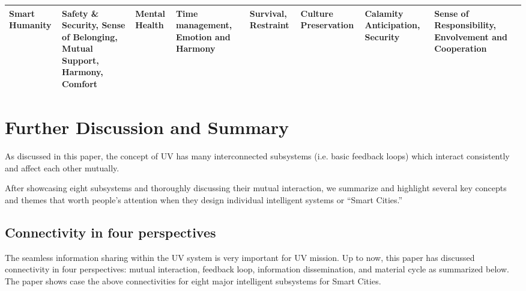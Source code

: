 \documentclass[letterpaper, twocolumn, 10pt, conference]{IEEEtran}
\begin{document}
\begin{landscape}
\begin{table}[p]
\begin{center}
\begin{tabularx}{1.3\textwidth}{|Y|Y|Y|Y|Y|Y|Y|Y|Y|}
                	Smart Humanity                             & Safety \& Security, Sense of Belonging, Mutual Support, Harmony, Comfort & Mental Health                                 & Time management, Emotion and Harmony                                 & Survival, Restraint                      & Culture Preservation                                & Calamity Anticipation, Security                                                     & Sense of Responsibility, Envolvement and Cooperation   &                                                                      \\ \hline
                \end{tabularx} 
                \label{tbl:interaction_systems}
        \end{center}
\end{table}
\end{landscape}


\restoregeometry



\section{Further Discussion and Summary}
\label{sec:FutureDiscussion}



As discussed in this paper, the concept of UV has many interconnected subsystems (i.e. basic feedback loops) which interact consistently and affect each other mutually. 

After showcasing eight subsystems and thoroughly discussing their mutual interaction, we summarize and highlight several key concepts and themes that worth people’s attention when they design individual intelligent systems or \enquote{Smart Cities.}

\subsection{Connectivity in four perspectives}
\label{ssec:Connectivity.4.scale}

The seamless information sharing within the UV system is very important for UV mission. Up to now, this paper has discussed connectivity in four perspectives: mutual interaction, feedback loop, information dissemination, and material cycle as summarized below. The paper shows case the above connectivities for eight major intelligent subsystems for Smart Cities. 
\end{document}
